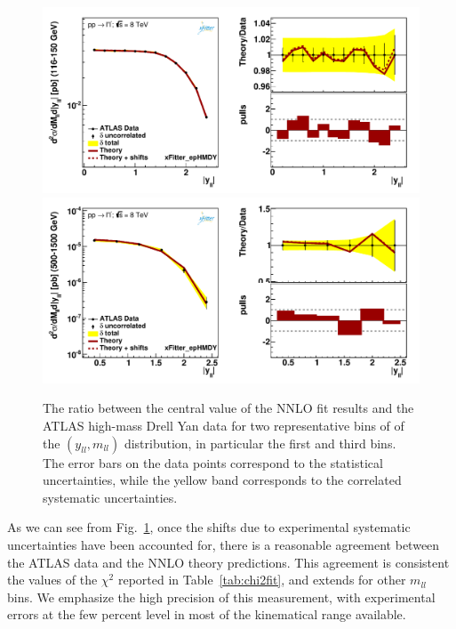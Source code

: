 \begin{figure}[t]
\centering
\includegraphics[width=16cm]{figs/data_401-1.pdf}\\
\includegraphics[width=16cm]{figs/data_405-1.pdf}\\
\caption{The ratio between the central value of the NNLO fit results
  and the ATLAS high-mass Drell Yan data
  for two representative bins of of the $(y_{ll},m_{ll})$ distribution,
  in particular the first and third bins.
  The error bars on the data points correspond to the statistical
  uncertainties, while the yellow band
  corresponds to the correlated systematic uncertainties.
}
\label{hmDY_2D}
\end{figure}

As we can see from Fig.~\ref{hmDY_2D}, once the shifts due to experimental systematic
uncertainties have been accounted for, there is a reasonable agreement
between the ATLAS data and the NNLO theory predictions.
%
This agreement is consistent the values of the $\chi^2$ reported in
Table~\ref{tab:chi2fit}, and extends for other $m_{ll}$ bins.
%
We emphasize the high precision of this measurement, with experimental
errors at the few percent level in most of the kinematical range available.

